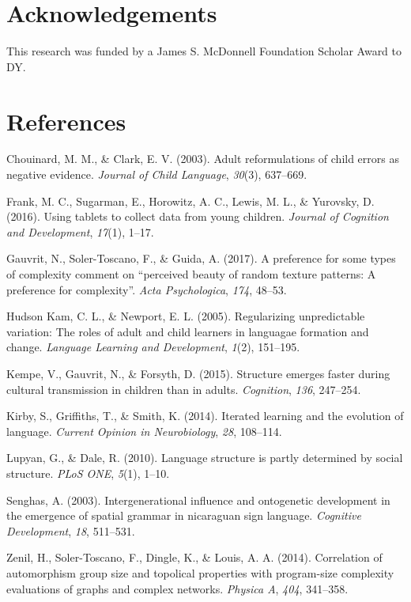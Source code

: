 \documentclass[10pt, letterpaper]{article}
\begin{document}
\hypertarget{acknowledgements}{%
\section{Acknowledgements}\label{acknowledgements}}

This research was funded by a James S. McDonnell Foundation Scholar
Award to DY.

\hypertarget{references}{%
\section{References}\label{references}}

\setlength{\parindent}{-0.1in} 
\setlength{\leftskip}{0.125in}

\noindent

\hypertarget{refs}{}
\leavevmode\hypertarget{ref-chouinard-2003}{}%
Chouinard, M. M., \& Clark, E. V. (2003). Adult reformulations of child
errors as negative evidence. \emph{Journal of Child Language},
\emph{30}(3), 637--669.

\leavevmode\hypertarget{ref-frank-2016}{}%
Frank, M. C., Sugarman, E., Horowitz, A. C., Lewis, M. L., \& Yurovsky,
D. (2016). Using tablets to collect data from young children.
\emph{Journal of Cognition and Development}, \emph{17}(1), 1--17.

\leavevmode\hypertarget{ref-gauvrit-2017}{}%
Gauvrit, N., Soler-Toscano, F., \& Guida, A. (2017). A preference for
some types of complexity comment on ``perceived beauty of random texture
patterns: A preference for complexity''. \emph{Acta Psychologica},
\emph{174}, 48--53.

\leavevmode\hypertarget{ref-hudsonkam-2005}{}%
Hudson Kam, C. L., \& Newport, E. L. (2005). Regularizing unpredictable
variation: The roles of adult and child learners in languagae formation
and change. \emph{Language Learning and Development}, \emph{1}(2),
151--195.

\leavevmode\hypertarget{ref-kempe-2015}{}%
Kempe, V., Gauvrit, N., \& Forsyth, D. (2015). Structure emerges faster
during cultural transmission in children than in adults.
\emph{Cognition}, \emph{136}, 247--254.

\leavevmode\hypertarget{ref-kirby-2014}{}%
Kirby, S., Griffiths, T., \& Smith, K. (2014). Iterated learning and the
evolution of language. \emph{Current Opinion in Neurobiology},
\emph{28}, 108--114.

\leavevmode\hypertarget{ref-lupyan-2010}{}%
Lupyan, G., \& Dale, R. (2010). Language structure is partly determined
by social structure. \emph{PLoS ONE}, \emph{5}(1), 1--10.

\leavevmode\hypertarget{ref-senghas-2003}{}%
Senghas, A. (2003). Intergenerational influence and ontogenetic
development in the emergence of spatial grammar in nicaraguan sign
language. \emph{Cognitive Development}, \emph{18}, 511--531.

\leavevmode\hypertarget{ref-zenil-2014}{}%
Zenil, H., Soler-Toscano, F., Dingle, K., \& Louis, A. A. (2014).
Correlation of automorphism group size and topolical properties with
program-size complexity evaluations of graphs and complex networks.
\emph{Physica A}, \emph{404}, 341--358.


\end{document}
